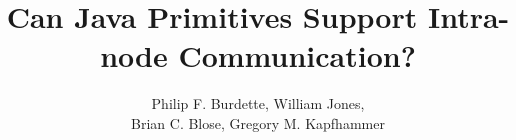 \documentclass{sig-alternate}
\begin{document}


\title{Can Java Primitives Support Intra-node Communication?}

\author{
\alignauthor Philip F. Burdette, William Jones, \\
 Brian C. Blose, Gregory M. Kapfhammer \\
       \\
        \\ 
}
\maketitle
\end{document}
